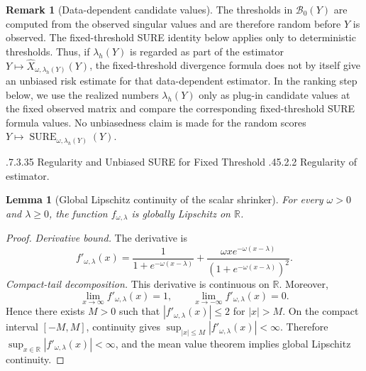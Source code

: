 \documentclass[12pt,reqno]{amsart}
\makeatletter
\numberwithin{equation}{section}
\def\subsection{\@startsection{subsection}{2}{\z@}%
  {.7\linespacing\@plus.3\linespacing}{.35\linespacing}%
  {\normalfont\bfseries\def\@secnumfont{\bfseries}}}
\def\paragraph{\@startsection{paragraph}{4}{\z@}%
  {.45\linespacing\@plus.2\linespacing}{.2\linespacing}%
  {\normalfont\bfseries}}
\theoremstyle{plain}
\newtheorem{lemma}[theorem]{Lemma}
\theoremstyle{definition}
\newtheorem{remark}[theorem]{Remark}
\newcommand{\R}{\mathbb{R}}
\makeatother
\begin{document}
\begin{remark}[Data-dependent candidate values]
The thresholds in $\mathcal B_0(Y)$ are computed from the observed singular values and are therefore random before $Y$ is observed. The fixed-threshold SURE identity below applies only to deterministic thresholds. Thus, if $\lambda_h(Y)$ is regarded as part of the estimator $Y\mapsto\widehat X_{\omega,\lambda_h(Y)}(Y)$, the fixed-threshold divergence formula does not by itself give an unbiased risk estimate for that data-dependent estimator. In the ranking step below, we use the realized numbers $\lambda_h(Y)$ only as plug-in candidate values at the fixed observed matrix and compare the corresponding fixed-threshold SURE formula values. No unbiasedness claim is made for the random scores $Y\mapsto\operatorname{SURE}_{\omega,\lambda_h(Y)}(Y)$.
\end{remark}

\subsection{Regularity and Unbiased SURE for Fixed Threshold}
\paragraph{Regularity of estimator.}
\begin{lemma}[Global Lipschitz continuity of the scalar shrinker]\label{lem:scalar-lip}
For every $\omega>0$ and $\lambda\geq 0$, the function $f_{\omega,\lambda}$ is globally Lipschitz on $\R$.
\end{lemma}

\begin{proof}
\emph{Derivative bound.} The derivative is
\begin{equation}
    f'_{\omega,\lambda}(x)
    =\frac{1}{1+e^{-\omega(x-\lambda)}}
    +\frac{\omega x e^{-\omega(x-\lambda)}}{(1+e^{-\omega(x-\lambda)})^2}.
\end{equation}
\emph{Compact-tail decomposition.} This derivative is continuous on $\R$. Moreover,
\begin{equation}
    \lim_{x\to\infty}f'_{\omega,\lambda}(x)=1,
    \qquad
    \lim_{x\to-\infty}f'_{\omega,\lambda}(x)=0.
\end{equation}
Hence there exists $M>0$ such that $|f'_{\omega,\lambda}(x)|\leq 2$ for $|x|>M$. On the compact interval $[-M,M]$, continuity gives $\sup_{|x|\leq M}|f'_{\omega,\lambda}(x)|<\infty$. Therefore $\sup_{x\in\R}|f'_{\omega,\lambda}(x)|<\infty$, and the mean value theorem implies global Lipschitz continuity.
\end{proof}
\end{document}
